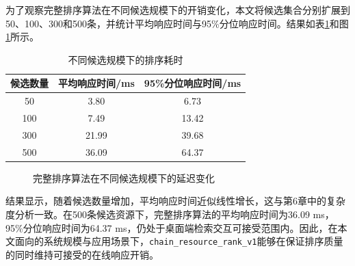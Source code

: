 为了观察完整排序算法在不同候选规模下的开销变化，本文将候选集合分别扩展到50、100、300和500条，并统计平均响应时间与95\%分位响应时间。结果如表\ref{tab:ranking_latency}和图\ref{fig:ranking_latency_curve}所示。

\begin{table}[htbp]
    \linespread{1.45}
    \songti
    \centering
    \caption{不同候选规模下的排序耗时}\label{tab:ranking_latency}
    \begin{tabular}{|c|c|c|}
        \hline
        候选数量 & 平均响应时间/ms & 95\%分位响应时间/ms \\ \hline
        50   & 3.80      & 6.73          \\ \hline
        100  & 7.49      & 13.42         \\ \hline
        300  & 21.99     & 39.68         \\ \hline
        500  & 36.09     & 64.37         \\ \hline
    \end{tabular}
\end{table}

\begin{figure}[htbp]
    \centering
    \caption{完整排序算法在不同候选规模下的延迟变化}
    \label{fig:ranking_latency_curve}
\end{figure}

结果显示，随着候选数量增加，平均响应时间近似线性增长，这与第6章中的复杂度分析一致。在500条候选资源下，完整排序算法的平均响应时间为36.09 ms，95\%分位响应时间为64.37 ms，仍处于桌面端检索交互可接受范围内。因此，在本文面向的系统规模与应用场景下，\texttt{chain\_resource\_rank\_v1}能够在保证排序质量的同时维持可接受的在线响应开销。


